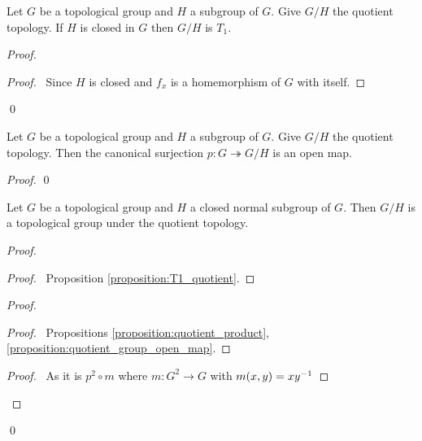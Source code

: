 \begin{proposition}
    \label{proposition:T1_quotient}
    Let $G$ be a topological group and $H$ a subgroup of $G$. Give $G / H$
    the quotient topology. If $H$ is closed in $G$ then $G / H$ is $T_1$.
\end{proposition}

\begin{proof}
    \pf
    \begin{proof}
        \pf\ Since $H$ is closed and $f_x$ is a homemorphism of $G$ with
        itself.
    \end{proof}
    \qed
\end{proof}

\begin{proposition}
    \label{proposition:quotient_group_open_map}
    Let $G$ be a topological group and $H$ a subgroup of $G$. Give $G / H$ the
    quotient topology. Then the canonical surjection $p : G \twoheadrightarrow G / H$
    is an open map.
\end{proposition}

\begin{proof}
    \pf
    \qed
\end{proof}

\begin{proposition}
    Let $G$ be a topological group and $H$ a closed normal subgroup of $G$.
    Then $G / H$ is a topological group under the quotient topology.
\end{proposition}

\begin{proof}
    \pf
    \begin{proof}
        \pf\ Proposition \ref{proposition:T1_quotient}.
    \end{proof}
    \begin{proof}
        \begin{proof}
            \pf\ Propositions \ref{proposition:quotient_product}, \ref{proposition:quotient_group_open_map}.
        \end{proof}
        \begin{proof}
            \pf\ As it is $p^2 \circ m$ where $m : G^2 \rightarrow G$ with
            $m(x,y) = x{y}^{-1}$
        \end{proof}
    \end{proof}
    \qed
\end{proof}

